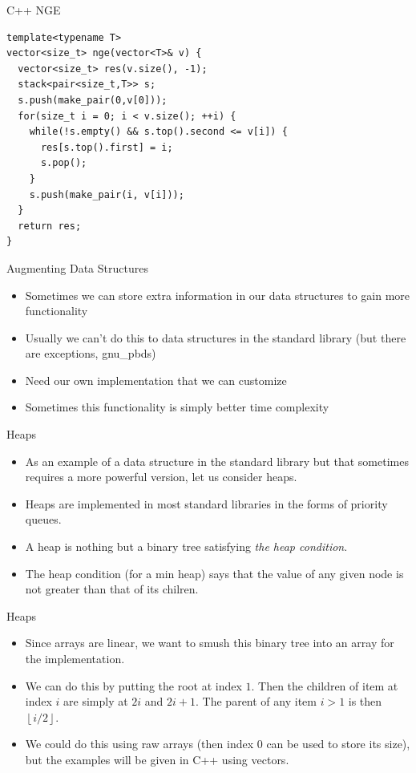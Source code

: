 \documentclass{beamer}
\newcommand\floor[1]{\left\lfloor#1\right\rfloor}
\begin{document}
\begin{frame}{C++ NGE}
    \begin{verbatim}
template<typename T>
vector<size_t> nge(vector<T>& v) {
  vector<size_t> res(v.size(), -1);
  stack<pair<size_t,T>> s; 
  s.push(make_pair(0,v[0]));
  for(size_t i = 0; i < v.size(); ++i) {
    while(!s.empty() && s.top().second <= v[i]) {
      res[s.top().first] = i; 
      s.pop(); 
    }
    s.push(make_pair(i, v[i])); 
  }
  return res; 
}
    \end{verbatim}
\end{frame}


\begin{frame}[plain]{Augmenting Data Structures}
    \begin{itemize}
        \item Sometimes we can store extra information in our data structures to gain more functionality
        \item Usually we can't do this to data structures in the standard library (but there are exceptions, gnu\_pbds)
        \item Need our own implementation that we can customize
        \item Sometimes this functionality is simply better time complexity
    \end{itemize}
\end{frame}

\begin{frame}[plain]{Heaps}
    \begin{itemize}
        \item As an example of a data structure in the standard library but that sometimes requires a more powerful version, let us consider heaps.
        \item Heaps are implemented in most standard libraries in the forms of priority queues.
        \item A heap is nothing but a binary tree satisfying \textit{the heap condition}.
        \item The heap condition (for a min heap) says that the value of any given node is not greater than that of its chilren.
    \end{itemize}
\end{frame}

\begin{frame}[plain]{Heaps}
    \begin{itemize}
        \item Since arrays are linear, we want to smush this binary tree into an array for the implementation.
        \item We can do this by putting the root at index $1$. Then the children of item at index $i$ are simply at $2i$ and $2i+1$. The parent of any item $i > 1$ is then $\floor{i/2}$.
        \item We could do this using raw arrays (then index $0$ can be used to store its size), but the examples will be given in C++ using vectors.
    \end{itemize}
\end{frame}
\end{document}
